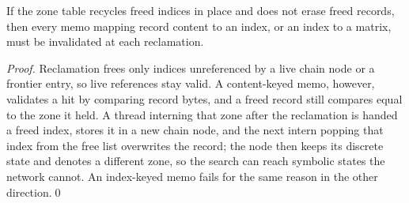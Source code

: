 \begin{proposition}\label{prop:gcsound}
If the zone table recycles freed indices in place and does not erase freed
records, then every memo mapping record content to an index, or an index to a
matrix, must be invalidated at each reclamation.
\end{proposition}
\begin{proof}
Reclamation frees only indices unreferenced by a live chain node or a frontier
entry, so live references stay valid.  A content-keyed memo, however, validates a
hit by comparing record bytes, and a freed record still compares equal to the
zone it held.  A thread interning that zone after the reclamation is handed a
freed index, stores it in a new chain node, and the next intern popping that
index from the free list overwrites the record; the node then keeps its discrete
state and denotes a different zone, so the search can reach symbolic states the
network cannot.  An index-keyed memo fails for the same reason in the other
direction.\qed
\end{proof}
